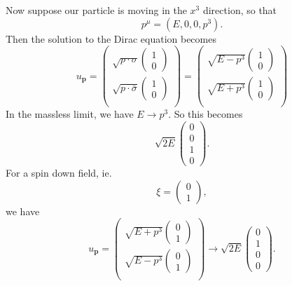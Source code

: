 \documentclass[a4paper]{article}
\begin{document}
Now suppose our particle is moving in the $x^3$ direction, so that
\[
  p^\mu = (E, 0, 0, p^3).
\]
Then the solution to the Dirac equation becomes
\[
  u_\mathbf{p} =
  \begin{pmatrix}
    \sqrt{p\cdot \sigma}
    \begin{pmatrix}
      1\\0
    \end{pmatrix}\\
    \sqrt{p\cdot \bar\sigma}
    \begin{pmatrix}
      1\\0
    \end{pmatrix}\\
  \end{pmatrix}
  =
  \begin{pmatrix}
    \sqrt{E - p^3}
    \begin{pmatrix}
      1\\0
    \end{pmatrix}\\
    \sqrt{E + p^3}
    \begin{pmatrix}
      1\\0
    \end{pmatrix}\\
  \end{pmatrix}
\]
In the massless limit, we have $E \to p^3$. So this becomes
\[
  \sqrt{2E}
  \begin{pmatrix}
    0\\0\\1\\0
  \end{pmatrix}.
\]
For a spin down field, ie.
\[
  \xi =
  \begin{pmatrix}
    0\\1
  \end{pmatrix},
\]
we have
\[
  u_\mathbf{p} =
  \begin{pmatrix}
    \sqrt{E + p^3}
    \begin{pmatrix}
      0\\1
    \end{pmatrix}\\
    \sqrt{E - p^3}
    \begin{pmatrix}
      0\\1
    \end{pmatrix}\\
  \end{pmatrix}
  \to
  \sqrt{2E}
  \begin{pmatrix}
    0\\1\\0\\0
  \end{pmatrix}.
\]
\end{document}
